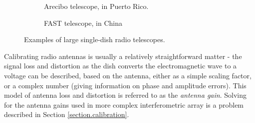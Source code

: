 \begin{figure}[ht]
\centering
\begin{subfigure}{.48\textwidth}
\caption{\label{fig.arecibo} Arecibo telescope, in Puerto Rico.}
\end{subfigure}
\hfill
\begin{subfigure}{.48\textwidth}
\caption{\label{fig.FAST} FAST telescope, in China}
\end{subfigure}
\caption{\label{fig.singleDishes} Examples of large single-dish radio telescopes.}
\end{figure}

\pg
Calibrating radio antennas is usually a relatively straightforward matter - the signal loss and distortion as the dish converts the electromagnetic wave to a voltage can be described, based on the antenna, either as a simple scaling factor, or a complex number (giving information on phase and amplitude errors). This model of antenna loss and distortion is referred to as the \emph{antenna gain}. Solving for the antenna gains used in more complex interferometric array is a problem described in Section \ref{section.calibration}.


